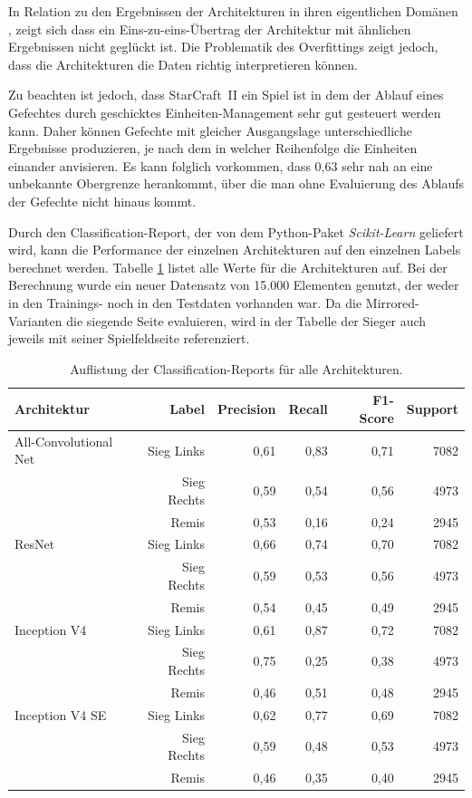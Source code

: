 In Relation zu den Ergebnissen der Architekturen in ihren eigentlichen Domänen \parencite{DBLP:journals/corr/SpringenbergDBR14, He_2016, DBLP:journals/corr/SzegedyIV16, DBLP:journals/corr/abs-1709-01507}, zeigt sich dass ein Eins-zu-eins-Übertrag der Architektur mit ähnlichen Ergebnissen nicht geglückt ist. Die Problematik des Overfittings zeigt jedoch, dass die Architekturen die Daten richtig interpretieren können. 

Zu beachten ist jedoch, dass StarCraft~II ein Spiel ist in dem der Ablauf eines Gefechtes durch geschicktes Einheiten-Management sehr gut gesteuert werden kann. Daher können Gefechte mit gleicher Ausgangslage unterschiedliche Ergebnisse produzieren, je nach dem in welcher Reihenfolge die Einheiten einander anvisieren. Es kann folglich vorkommen, dass 0,63 sehr nah an eine unbekannte Obergrenze herankommt, über die man ohne Evaluierung des Ablaufs der Gefechte nicht hinaus kommt. 

Durch den Classification-Report, der von dem Python-Paket \textit{Scikit-Learn} geliefert wird, kann die Performance der einzelnen Architekturen auf den einzelnen Labels berechnet werden. Tabelle \ref{tb:classrep} listet alle Werte für die Architekturen auf. Bei der Berechnung wurde ein neuer Datensatz von 15.000 Elementen genutzt, der weder in den Trainings- noch in den Testdaten vorhanden war. Da die Mirrored-Varianten die siegende Seite evaluieren, wird in der Tabelle der Sieger auch jeweils mit seiner Spielfeldseite referenziert. 

\begin{table}[H]
\centering
\caption{Auflistung der Classification-Reports für alle Architekturen.}
\begin{tabular}{@{}lrrrrr@{}}
\hline
Architektur & Label & Precision & Recall & F1-Score & Support\\
\hline
All-Convolutional Net & Sieg Links & 0,61 & 0,83 & 0,71 & 7082\\
& Sieg Rechts & 0,59 & 0,54 & 0,56 & 4973 \\
& Remis & 0,53 & 0,16 & 0,24 & 2945 \\
\hline
ResNet & Sieg Links & 0,66 & 0,74 & 0,70 & 7082\\
& Sieg Rechts & 0,59 & 0,53 & 0,56 & 4973\\
& Remis & 0,54 & 0,45 & 0,49 & 2945\\
\hline
Inception V4 & Sieg Links & 0,61 & 0,87 & 0,72 & 7082 \\
& Sieg Rechts & 0,75 & 0,25 & 0,38 & 4973 \\
& Remis & 0,46 & 0,51 & 0,48 & 2945 \\
\hline
Inception V4 SE & Sieg Links & 0,62 & 0,77 & 0,69 & 7082\\
& Sieg Rechts & 0,59 & 0,48 & 0,53 & 4973\\
& Remis & 0,46 & 0,35 & 0,40 & 2945\\
\hline
\end{tabular}
\label{tb:classrep}
\end{table}

